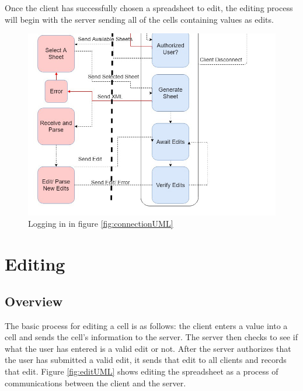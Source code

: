 \documentclass[titlepage]{article}
\begin{document}
        Once the client has successfully chosen a spreadsheet to edit, the editing process will begin with the server
        sending all of the cells containing values as edits. 

        \begin{figure}[h!]
            \centering
            \includegraphics[width=.9\linewidth]{2-4}
            \caption{Logging in in figure \ref{fig:connectionUML}}
            \label{fig:loginUML}
        \end{figure}
            
\section{Editing}
\subsection{Overview}
    The basic process for editing a cell is as follows: the client enters a value into a cell and
    sends the cell’s information to the server. The server then checks to see if what the user
    has entered is a valid edit or not. After the server authorizes that the user has submitted a 
    valid edit, it sends that edit to all clients and records that edit. Figure \ref{fig:editUML} shows editing
    the spreadsheet as a process of communications between the client and the server.
\end{document}
